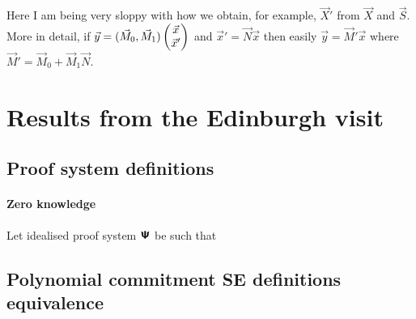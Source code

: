 \documentclass[runningheads,11pt]{llncs}
\let\spvec\vec \let\vec\accentvec
\let\vec\spvec
\begin{document}
Here I am being very sloppy with how we obtain, for example, $\vec X'$ from $\vec X$ and
$\vec S$.
More in detail, if 
$\vec y = (\vec M_0, \vec M_1) \pmtrx{\vec x\\\vec x'}$ and $\vec x' = \vec N \vec x$ then
easily $\vec y = \vec M' \vec x$ where $\vec M' = \vec M_0 + \vec M_1\vec N$.

\section{Results from the Edinburgh visit}
\subsection{Proof system definitions}
\paragraph{Zero knowledge}
Let idealised proof system $\bm{\mathsf{\Psi}}$ be such that  

\subsection{Polynomial commitment SE definitions equivalence}
\newcommand{\Qop}{Q_{op}}
\newcommand{\Qsim}{Q_{sim}}
\newcommand{\Qchal}{{Q_{chal}}}
\newcommand{\Qh}{Q_{ro}}


\newcommand{\qop}{q_{op}}
\newcommand{\qchal}{q_{chal}}
\end{document}
